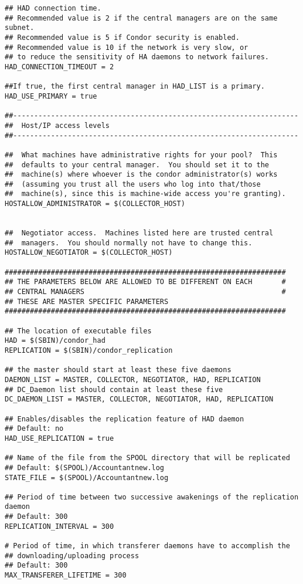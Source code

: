 \begin{verbatim}
## HAD connection time.
## Recommended value is 2 if the central managers are on the same subnet.
## Recommended value is 5 if Condor security is enabled.
## Recommended value is 10 if the network is very slow, or
## to reduce the sensitivity of HA daemons to network failures.
HAD_CONNECTION_TIMEOUT = 2

##If true, the first central manager in HAD_LIST is a primary.
HAD_USE_PRIMARY = true

##--------------------------------------------------------------------
##  Host/IP access levels
##--------------------------------------------------------------------

##  What machines have administrative rights for your pool?  This
##  defaults to your central manager.  You should set it to the
##  machine(s) where whoever is the condor administrator(s) works
##  (assuming you trust all the users who log into that/those
##  machine(s), since this is machine-wide access you're granting).
HOSTALLOW_ADMINISTRATOR = $(COLLECTOR_HOST) 


##  Negotiator access.  Machines listed here are trusted central
##  managers.  You should normally not have to change this.
HOSTALLOW_NEGOTIATOR = $(COLLECTOR_HOST)

###################################################################
## THE PARAMETERS BELOW ARE ALLOWED TO BE DIFFERENT ON EACH       #
## CENTRAL MANAGERS                                               #
## THESE ARE MASTER SPECIFIC PARAMETERS
###################################################################

## The location of executable files
HAD = $(SBIN)/condor_had
REPLICATION = $(SBIN)/condor_replication

## the master should start at least these five daemons
DAEMON_LIST = MASTER, COLLECTOR, NEGOTIATOR, HAD, REPLICATION
## DC_Daemon list should contain at least these five
DC_DAEMON_LIST = MASTER, COLLECTOR, NEGOTIATOR, HAD, REPLICATION

## Enables/disables the replication feature of HAD daemon
## Default: no
HAD_USE_REPLICATION = true

## Name of the file from the SPOOL directory that will be replicated
## Default: $(SPOOL)/Accountantnew.log
STATE_FILE = $(SPOOL)/Accountantnew.log

## Period of time between two successive awakenings of the replication daemon
## Default: 300
REPLICATION_INTERVAL = 300

# Period of time, in which transferer daemons have to accomplish the 
## downloading/uploading process
## Default: 300
MAX_TRANSFERER_LIFETIME = 300


\end{verbatim}
